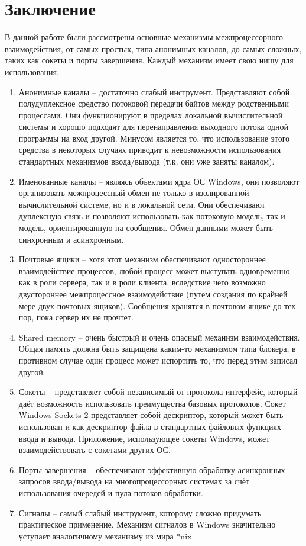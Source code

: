 \documentclass[a4paper, 12pt]{report}		%
\begin{document}
\chapter*{Заключение}

В данной работе были рассмотрены основные механизмы межпроцессорного взаимодействия, от самых простых, типа анонимных каналов, до самых сложных, таких как сокеты и порты завершения. Каждый механизм имеет свою нишу для использования.
\vspace{1em}

\begin{enumerate}
    \item Анонимные каналы -- достаточно слабый инструмент. Представляют собой полудуплексное средство потоковой передачи байтов между родственными процессами. Они функционируют в пределах локальной вычислительной системы и хорошо подходят для перенаправления выходного потока одной программы на вход другой. Минусом является то, что использование этого средства в некоторых случаях приводит к невозможности использования стандартных механизмов ввода/вывода (т.к. они уже заняты каналом).
    \item Именованные каналы -- являясь объектами ядра ОС Windows, они позволяют организовать межпроцессный обмен не только в изолированной вычислительной системе, но и в локальной сети. Они обеспечивают дуплексную связь и позволяют использовать как потоковую модель, так и модель, ориентированную на сообщения. Обмен данными может быть синхронным и асинхронным.
    \item Почтовые ящики -- хотя этот механизм обеспечивают одностороннее взаимодействие процессов, любой процесс может выступать одновременно как в роли сервера, так и в роли клиента, вследствие чего возможно двустороннее межпроцессное взаимодействие (путем создания по крайней мере двух почтовых ящиков). Сообщения хранятся в почтовом ящике до тех пор, пока сервер их не прочтет.
    \item Shared memory -- очень быстрый и очень опасный механизм взаимодействия. Общая память должна быть защищена каким-то механизмом типа блокера, в противном случае один процесс может испортить то, что перед этим записал другой.
    \item Сокеты -- представляет собой независимый от протокола интерфейс, который даёт возможность использовать преимущества базовых протоколов. Сокет Windows Sockets 2 представляет собой дескриптор, который может быть использован и как дескриптор файла в стандартных файловых функциях ввода и вывода. Приложение, использующее сокеты Windows, может взаимодействовать с сокетами других ОС.
    \item Порты завершения -- обеспечивают эффективную обработку асинхронных запросов ввода/вывода на многопроцессорных системах за счёт использования очередей и пула потоков обработки.
    \item Сигналы -- самый слабый инструмент, которому сложно придумать практическое применение. Механизм сигналов в Windows значительно уступает аналогичному механизму из мира *nix.
\end{enumerate}
\end{document}
